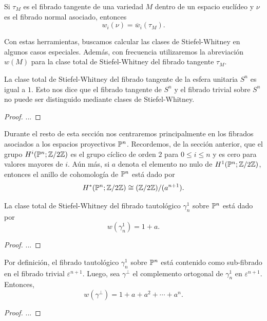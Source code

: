 \begin{theorem}\label{Dualidad de Whitney}
	Si $\tau_{M}$ es el fibrado tangente de una variedad $M$ dentro de un espacio euclídeo y $\nu$ es el fibrado normal asociado, entonces
	\[ w_{i}(\nu) = \overline{w}_{i}(\tau_{M}). \]
\end{theorem}

Con estas herramientas, buscamos calcular las clases de Stiefel-Whitney en algunos casos especiales. Además, con frecuencia utilizaremos la abreviación $w(M)$ para la clase total de Stiefel-Whitney del fibrado tangente $\tau_{M}$.

\begin{example}
	La clase total de Stiefel-Whitney del fibrado tangente de la esfera unitaria $S^{n}$ es igual a $1$. Esto nos dice que el fibrado tangente de $S^{n}$ y el fibrado trivial sobre $S^{n}$ no puede ser distinguido mediante clases de Stiefel-Whitney.
\end{example}
\begin{proof}
	...
\end{proof}

Durante el resto de esta sección nos centraremos principalmente en los fibrados asociados a los espacios proyectivos $\P^{n}$. Recordemos, de la sección anterior, que el grupo $H^{i}(\P^{n}; \Z \slash 2\Z)$ es el grupo cíclico de orden $2$ para $0 \leq i \leq n$ y es cero para valores mayores de $i$. Aún más, si $a$ denota el elemento no nulo de $H^{1}(\P^{n}; \Z \slash 2\Z)$, entonces el anillo de cohomología de $\P^{n}$ está dado por
\[ H^{*}(\P^{n}; \Z \slash 2\Z) \cong (\Z \slash 2\Z) \slash (a^{n+1}). \]


\begin{example}
	La clase total de Stiefel-Whitney del fibrado tautológico $\gamma_{n}^{1}$ sobre $\P^{n}$ está dado por
	\[ w(\gamma_{n}^{1}) = 1 + a. \]
\end{example}
\begin{proof}
	...
\end{proof}

\begin{example}
	Por definición, el fibrado tautológico $\gamma_{n}^{1}$ sobre $\P^{n}$ está contenido como sub-fibrado en el fibrado trivial $\varepsilon^{n+1}$. Luego, sea $\gamma^{\perp}$ el complemento ortogonal de $\gamma_{n}^{1}$ en $\varepsilon^{n+1}$. Entonces,
	\[ w(\gamma^{\perp}) = 1 + a + a^{2} + \cdots + a^{n}. \]
\end{example}
\begin{proof}
	...
\end{proof}

